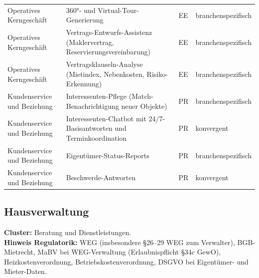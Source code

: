 \documentclass[a4paper,11pt]{article}
\begin{document}
\begin{table}[H]
\begin{tabular}{p{3.3cm}p{7.3cm}p{1cm}p{2.5cm}}
Operatives Kerngeschäft & 360°- und Virtual-Tour-Generierung & EE & branchenspezifisch \\
Operatives Kerngeschäft & Vertrags-Entwurfs-Assistenz (Maklervertrag, Reservierungsvereinbarung) & EE & branchenspezifisch \\
Operatives Kerngeschäft & Vertragsklauseln-Analyse (Mietindex, Nebenkosten, Risiko-Erkennung) & EE & branchenspezifisch \\
Kundenservice und Beziehung & Interessenten-Pflege (Match-Benachrichtigung neuer Objekte) & PR & branchenspezifisch \\
Kundenservice und Beziehung & Interessenten-Chatbot mit 24/7-Basisantworten und Terminkoordination & PR & konvergent \\
Kundenservice und Beziehung & Eigentümer-Status-Reports & PR & branchenspezifisch \\
Kundenservice und Beziehung & Beschwerde-Antworten & PR & konvergent \\
\bottomrule
\end{tabular}
\end{table}

\subsection*{Hausverwaltung}

\textbf{Cluster:} Beratung und Dienstleistungen. \\
\textbf{Hinweis Regulatorik:} WEG (insbesondere §26--29 WEG zum
Verwalter), BGB-Mietrecht, MaBV bei WEG-Verwaltung
(Erlaubnispflicht §34c GewO), Heizkostenverordnung,
Betriebskostenverordnung, DSGVO bei Eigentümer- und Mieter-Daten.
\end{document}
